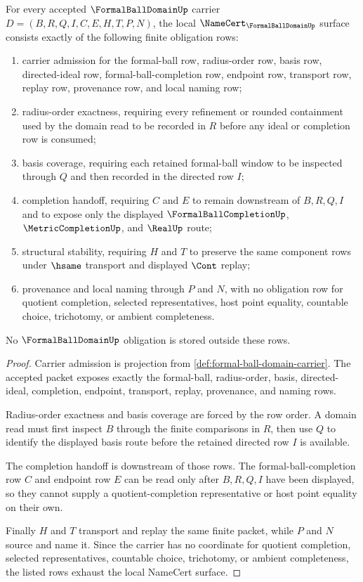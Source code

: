 \begin{theorem}\label{thm:formal-ball-domain-namecert-obligations}
For every accepted $\FormalBallDomainUp$ carrier $D=(B,R,Q,I,C,E,H,T,P,N)$, the local $\NameCert_{\FormalBallDomainUp}$ surface consists exactly of the following finite obligation rows:
\begin{enumerate}
\item carrier admission for the formal-ball row, radius-order row, basis row, directed-ideal row, formal-ball-completion row, endpoint row, transport row, replay row, provenance row, and local naming row;
\item radius-order exactness, requiring every refinement or rounded containment used by the domain read to be recorded in $R$ before any ideal or completion row is consumed;
\item basis coverage, requiring each retained formal-ball window to be inspected through $Q$ and then recorded in the directed row $I$;
\item completion handoff, requiring $C$ and $E$ to remain downstream of $B,R,Q,I$ and to expose only the displayed $\FormalBallCompletionUp$, $\MetricCompletionUp$, and $\RealUp$ route;
\item structural stability, requiring $H$ and $T$ to preserve the same component rows under $\hsame$ transport and displayed $\Cont$ replay;
\item provenance and local naming through $P$ and $N$, with no obligation row for quotient completion, selected representatives, host point equality, countable choice, trichotomy, or ambient completeness.
\end{enumerate}
No $\FormalBallDomainUp$ obligation is stored outside these rows.
\end{theorem}
\begin{proof}
Carrier admission is projection from \autoref{def:formal-ball-domain-carrier}. The accepted packet exposes exactly the formal-ball, radius-order, basis, directed-ideal, completion, endpoint, transport, replay, provenance, and naming rows.

Radius-order exactness and basis coverage are forced by the row order. A domain read must first inspect $B$ through the finite comparisons in $R$, then use $Q$ to identify the displayed basis route before the retained directed row $I$ is available.

The completion handoff is downstream of those rows. The formal-ball-completion row $C$ and endpoint row $E$ can be read only after $B,R,Q,I$ have been displayed, so they cannot supply a quotient-completion representative or host point equality on their own.

Finally $H$ and $T$ transport and replay the same finite packet, while $P$ and $N$ source and name it. Since the carrier has no coordinate for quotient completion, selected representatives, countable choice, trichotomy, or ambient completeness, the listed rows exhaust the local NameCert surface.
\end{proof}


